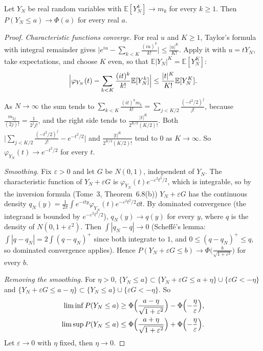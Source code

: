 \begin{lemma}\label{lem:momentslaw}
Let $Y_N$ be real random variables with $\mathbb E[Y_N^k]\to m_k$ for every $k\ge1$. Then $P(Y_N\le a)\to\Phi(a)$ for every real $a$.
\end{lemma}
\begin{proof}
\emph{Characteristic functions converge.} For real $u$ and $K\ge1$, Taylor's formula with integral remainder gives $\bigl|e^{iu}-\sum_{k<K}\frac{(iu)^k}{k!}\bigr|\le\frac{|u|^K}{K!}$. Apply it with $u=tY_N$, take expectations,
and choose $K$ even, so that $\mathbb E|Y_N|^K=\mathbb E[Y_N^K]$:
\[
\Bigl|\varphi_{Y_N}(t)-\sum_{k<K}\frac{(it)^k}{k!}\mathbb E[Y_N^k]\Bigr|\le\frac{|t|^K}{K!}\mathbb E[Y_N^K].
\]
As $N\to\infty$ the sum tends to $\sum_{k<K}\frac{(it)^km_k}{k!}=\sum_{j<K/2}\frac{(-t^2/2)^j}{j!}$, because $\frac{m_{2j}}{(2j)!}=\frac1{2^jj!}$, and the right side tends to $\frac{|t|^K}{2^{K/2}(K/2)!}$. Both
$\bigl|\sum_{j<K/2}\frac{(-t^2/2)^j}{j!}-e^{-t^2/2}\bigr|$ and $\frac{|t|^K}{2^{K/2}(K/2)!}$ tend to $0$ as $K\to\infty$. So $\varphi_{Y_N}(t)\to e^{-t^2/2}$ for every $t$.

\emph{Smoothing.} Fix $\varepsilon>0$ and let $G$ be $N(0,1)$, independent of $Y_N$. The characteristic function of $Y_N+\varepsilon G$ is $\varphi_{Y_N}(t)e^{-\varepsilon^2t^2/2}$, which is integrable, so by the inversion formula
(Tome~3, Theorem~6.8(b)) $Y_N+\varepsilon G$ has the continuous density $q_N(y)=\frac1{2\pi}\int e^{-ity}\varphi_{Y_N}(t)e^{-\varepsilon^2t^2/2}\dd t$. By dominated convergence (the integrand is bounded by $e^{-\varepsilon^2t^2/2}$),
$q_N(y)\to q(y)$ for every $y$, where $q$ is the density of $N(0,1+\varepsilon^2)$. Then $\int|q_N-q|\to0$ (Scheffé's lemma: $\int|q-q_N|=2\int(q-q_N)^+$ since both integrate to $1$, and $0\le(q-q_N)^+\le q$, so dominated
convergence applies). Hence $P(Y_N+\varepsilon G\le b)\to\Phi\bigl(\frac b{\sqrt{1+\varepsilon^2}}\bigr)$ for every $b$.

\emph{Removing the smoothing.} For $\eta>0$, $\{Y_N\le a\}\subset\{Y_N+\varepsilon G\le a+\eta\}\cup\{\varepsilon G<-\eta\}$ and $\{Y_N+\varepsilon G\le a-\eta\}\subset\{Y_N\le a\}\cup\{\varepsilon G<-\eta\}$. So
\[
\begin{aligned}\liminf P(Y_N\le a)&\ge\Phi\Bigl(\frac{a-\eta}{\sqrt{1+\varepsilon^2}}\Bigr)-\Phi\Bigl(-\frac\eta\varepsilon\Bigr),\\\limsup P(Y_N\le a)&\le\Phi\Bigl(\frac{a+\eta}{\sqrt{1+\varepsilon^2}}\Bigr)+\Phi\Bigl(-\frac\eta\varepsilon\Bigr).\end{aligned}
\]
Let $\varepsilon\to0$ with $\eta$ fixed, then $\eta\to0$.
\end{proof}

